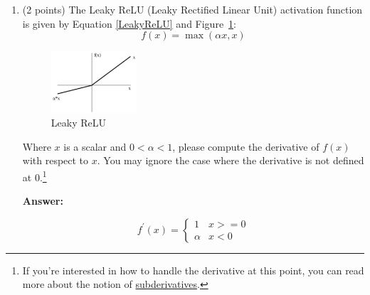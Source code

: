 \documentclass{article}
\newenvironment{answer}{
    {\bf Answer:} \sf \begingroup\color{red}
}{\endgroup}%
\begin{document}
\begin{enumerate}[label=(\alph*)]
\begin{shaded}
\begin{answer}

    \begin{equation}
        \frac{\partial{J(\bm v_c,o,\bm U)}}{\partial{\bm U}}
        \begin{bmatrix}
            \frac{\partial{J(\bm v_c,o,\bm U)}}{\partial{\bm u_1}} & \frac{\partial{J(\bm v_c,o,\bm U)}}{\partial{\bm u_2}} & \cdots & \frac{\partial{J(\bm v_c,o,\bm U)}}{\partial{\bm u_n}}
        \end{bmatrix} \\
        =(\hat{\bm y} - \bm y)^T \cdot \bm v_c
        \label{eq:1d}
    \end{equation}

\end{answer}
\end{shaded}

\item (2 points) The Leaky ReLU (Leaky Rectified Linear Unit) activation function is given by Equation \ref{LeakyReLU} and Figure~\ref{fig:leaky_relu}:
\begin{equation}
    \label{LeakyReLU}
    f(x) = \max(\alpha x, x)
\end{equation}

\begin{figure}[h]
    \centering
    \includegraphics[width=0.3\textwidth]{leaky_relu_graph.png}
    \caption{Leaky ReLU}
    \label{fig:leaky_relu}
\end{figure}

Where $x$ is a scalar and $0<\alpha <1$, please compute the derivative of $f(x)$ with respect to $x$. You may ignore the case where the derivative is not defined at 0.\footnote{If you're interested in how to handle the derivative at this point, you can read more about the notion of \hyperref[https://en.wikipedia.org/wiki/Subderivative]{subderivatives}.}

\begin{shaded}
\begin{answer}

    \begin{equation}
        f^\prime(x) =
        \begin{cases}
            1 & x>=0 \\
            \alpha & x < 0
        \end{cases}\label{eq:1e}
    \end{equation}


\end{answer}
\end{shaded}
\end{enumerate}
\end{document}
